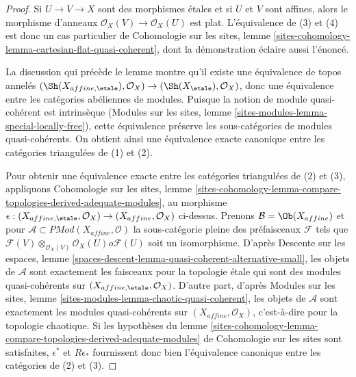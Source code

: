 \begin{proof}
Si $U\to V\to X$ sont des morphismes \'etales et si $U$ et $V$ sont affines,
alors le morphisme d'anneaux
$\mathcal{O}_X(V)\to\mathcal{O}_X(U)$ est plat. L'\'equivalence de (3) et (4)
est donc un cas particulier de Cohomologie sur les sites, lemme
\ref{sites-cohomology-lemma-cartesian-flat-quasi-coherent}, dont la
d\'emonstration \'eclaire aussi l'\'enonc\'e.

\medskip\noindent
La discussion qui pr\'ec\`ede le lemme montre qu'il existe une \'equivalence de
topos annel\'es
$(\Sh(X_{affine,\etale}),\mathcal{O}_X)\to
(\Sh(X_\etale),\mathcal{O}_X)$, donc une \'equivalence entre les cat\'egories
ab\'eliennes de modules. Puisque la notion de module quasi-coh\'erent est
intrins\`eque (Modules sur les sites, lemme
\ref{sites-modules-lemma-special-locally-free}), cette \'equivalence pr\'eserve
les sous-cat\'egories de modules quasi-coh\'erents. On obtient ainsi une
\'equivalence exacte canonique entre les cat\'egories triangul\'ees de (1) et
(2).

\medskip\noindent
Pour obtenir une \'equivalence exacte entre les cat\'egories triangul\'ees de
(2) et (3), appliquons Cohomologie sur les sites, lemme
\ref{sites-cohomology-lemma-compare-topologies-derived-adequate-modules}, au
morphisme
$\epsilon:(X_{affine,\etale},\mathcal{O}_X)\to
(X_{affine},\mathcal{O}_X)$ ci-dessus. Prenons
$\mathcal{B}=\Ob(X_{affine})$ et pour
$\mathcal{A}\subset\textit{PMod}(X_{affine},\mathcal{O})$ la sous-cat\'egorie
pleine des pr\'efaisceaux $\mathcal{F}$ tels que
$\mathcal{F}(V)\otimes_{\mathcal{O}_X(V)}\mathcal{O}_X(U)	o\mathcal{F}(U)$
soit un isomorphisme. D'apr\`es Descente sur les espaces, lemme
\ref{spaces-descent-lemma-quasi-coherent-alternative-small}, les objets de
$\mathcal{A}$ sont exactement les faisceaux pour la topologie \'etale qui sont
des modules quasi-coh\'erents sur
$(X_{affine,\etale},\mathcal{O}_X)$. D'autre part, d'apr\`es Modules sur les
sites, lemme \ref{sites-modules-lemma-chaotic-quasi-coherent}, les objets de
$\mathcal{A}$ sont exactement les modules quasi-coh\'erents sur
$(X_{affine},\mathcal{O}_X)$, c'est-\`a-dire pour la topologie chaotique. Si les
hypoth\`eses du lemme
\ref{sites-cohomology-lemma-compare-topologies-derived-adequate-modules} de
Cohomologie sur les sites sont satisfaites, $\epsilon^*$ et $R\epsilon_*$
fournissent donc bien l'\'equivalence canonique entre les cat\'egories de (2) et
(3).


\end{proof}
